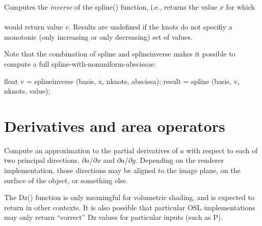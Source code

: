 \documentclass[11pt,letterpaper]{book}
\def\P{{\cf P}\xspace}
\begin{document}

Computes the \emph{inverse} of the {\cf spline()} function, i.e., returns
the value $x$ for which \\
   \\ 
would return value
$v$.  Results are undefined if the knots do not specifiy a monotonic
(only increasing or only decreasing) set of values.

Note that the combination of {\cf spline} and {\cf splineinverse} makes
it possible to compute a full spline-with-nonuniform-abscissae:
\begin{smallcode}
    float v = splineinverse (basis, x, nknots, abscissa);
    result = spline (basis, v, nknots, value);
\end{smallcode}
\apiend


\newpage
\section{Derivatives and area operators}
\label{sec:stdlib:derivs}

 
Compute an approximation to the partial derivatives of $a$ with respect to
each of two principal directions, $\partial a / \partial x$ and
$\partial a / \partial y$.  Depending on the renderer
implementation, those directions may be aligned to the image plane,
on the surface of the object, or something else.

The {\cf Dz()} function is only meaningful for volumetric shading, and
is expected to return {} in other contexts.  It is also possible
that particular OSL implementations may only return ``correct'' {\cf Dz}
values for particular inputs (such as \P).
\apiend
\end{document}

